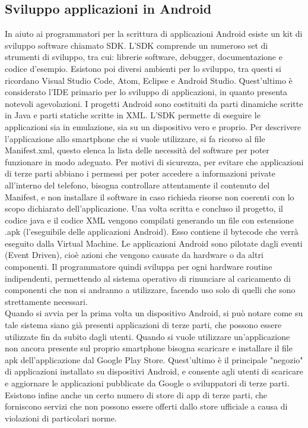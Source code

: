 \subsection{Sviluppo applicazioni in Android}
In aiuto ai programmatori per la scrittura di applicazioni Android esiste un
kit di sviluppo software  chiamato SDK. L’SDK  comprende un numeroso set di
strumenti di sviluppo, tra cui: librerie software, debugger, documentazione e
codice d’esempio. Esistono poi diversi ambienti per lo sviluppo, tra questi si
ricordano Visual Studio Code, Atom, Eclipse e Android Studio. Quest'ultimo è considerato l'IDE
primario per lo sviluppo di applicazioni, in quanto presenta notevoli agevolazioni.
I progetti Android sono costituiti da parti dinamiche scritte in Java e
parti statiche scritte in XML. L’SDK permette  di eseguire le applicazioni sia
in emulazione, sia su un dispositivo vero e proprio. Per descrivere
l’applicazione allo smartphone che si vuole utilizzare, si fa ricorso al file
Manifest.xml, questo elenca la lista delle necessità del software per poter
funzionare in modo adeguato. Per motivi di sicurezza, per evitare che
applicazioni di terze parti abbiano i permessi per poter accedere a informazioni
private all’interno del
telefono, bisogna controllare attentamente il contenuto del Manifest, e non
installare il software in caso richieda risorse non coerenti con lo scopo
dichiarato dell’applicazione. Una volta scritta e concluso il progetto, il
codice java e il codice XML vengono compilati generando un file con estensione
.apk (l’eseguibile delle applicazioni Android). Esso contiene il bytecode che verrà
eseguito dalla Virtual Machine. Le applicazioni Android sono pilotate
dagli eventi (Event Driven), cioè azioni che vengono causate da hardware o da altri
componenti. Il programmatore quindi sviluppa per ogni hardware routine
indipendenti, permettendo al sistema operativo di rinunciare al caricamento di
componenti che non si andranno a utilizzare, facendo uso solo di quelli che sono
strettamente necessari. \\
Quando si avvia per la prima volta un dispositivo Android, si può notare come su
tale sistema siano già presenti
applicazioni di terze parti, che possono essere utilizzate fin da subito
dagli utenti. Quando si vuole utilizzare un'applicazione non ancora presente sul
proprio smartphone bisogna scaricare e installare il file apk dell’applicazione
dal Google Play Store. Quest’ultimo è il principale "negozio" di
applicazioni installato su dispositivi Android, e consente agli utenti di
scaricare e aggiornare le applicazioni pubblicate da Google o sviluppatori di
terze parti. Esistono infine anche un certo numero di store di app di terze
parti, che forniscono servizi che non possono essere offerti dallo store
ufficiale a causa di violazioni di particolari norme.

